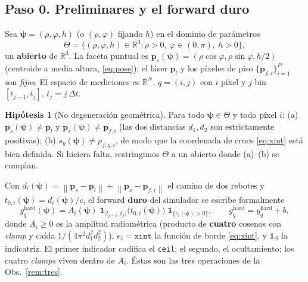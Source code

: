 \documentclass[11pt,a4paper]{article}
\theoremstyle{plain}
\theoremstyle{definition}
\newtheorem{assumption}{Hip\'otesis}
\newcommand{\vect}[1]{\boldsymbol{#1}}
\newcommand{\R}{\mathbb{R}}
\newcommand{\norm}[1]{\left\lVert #1 \right\rVert}
\begin{document}
\subsection*{Paso 0. Preliminares y el forward duro}
\label{sec:prelim}

Sea $\vect{\psi}=(\rho,\varphi,h)$ (o $(\rho,\varphi)$ fijando $h$) en el dominio
de par\'ametros
\begin{equation}
    \Theta=\bigl\{(\rho,\varphi,h)\in\R^3 : \rho>0,\ \varphi\in(0,\pi),\ h>0\bigr\},
    \label{eq:Theta}
\end{equation}
un \textbf{abierto} de $\R^3$. La faceta puntual es
$\vect{p}_s(\vect{\psi})=(\rho\cos\varphi,\rho\sin\varphi,h/2)$ (centroide a media
altura, \eqref{eq:pose}); el l\'aser $\vect{p}_l$ y los p\'ixeles de piso
$\{\vect{p}_{f,i}\}_{i=1}^{P}$ son \emph{fijos}. El espacio de mediciones es $\R^N$, $q=(i,j)$ con $i$ p\'ixel y $j$
bin $[t_{j-1},t_j]$, $t_j=j\,\Delta t$.

\begin{assumption}[No degeneraci\'on geom\'etrica]\label{as:geom}
Para todo $\vect{\psi}\in\Theta$ y todo p\'ixel $i$:
(a) $\vect{p}_s(\vect{\psi})\neq\vect{p}_l$ y
$\vect{p}_s(\vect{\psi})\neq\vect{p}_{f,i}$ (las dos distancias $d_1,d_2$ son
estrictamente positivas);
(b) $s_y(\vect{\psi})\neq p_{f,y,i}$, de modo que la coordenada de cruce
\eqref{eq:xint} est\'a bien definida. Si hiciera falta, restringimos $\Theta$ a
un abierto donde (a)--(b) se cumplan.
\end{assumption}

Con $d_i(\vect{\psi})=\norm{\vect{p}_s-\vect{p}_l}+\norm{\vect{p}_s-\vect{p}_{f,i}}$
el camino de dos rebotes y $t_{0,i}(\vect{\psi})=d_i(\vect{\psi})/c$, el forward
\textbf{duro} del simulador se escribe formalmente
\begin{equation}
    y^{\mathrm{hard}}_q(\vect{\psi})
    =A_i(\vect{\psi})\;
    \mathbf{1}_{[t_{j-1},t_j)}\!\bigl(t_{0,i}(\vect{\psi})\bigr)\;
    \mathbf{1}_{\{e_i(\vect{\psi})>0\}},
    \qquad g^{\mathrm{hard}}_q=y^{\mathrm{hard}}_q+b,
    \label{eq:hard}
\end{equation}
donde $A_i\ge0$ es la amplitud radiom\'etrica (producto de \textbf{cuatro}
cosenos con \emph{clamp} y ca\'ida $1/(4\pi^2 d_1^2 d_2^2)$), $e_i=\texttt{xint}$
la funci\'on de borde \eqref{eq:xint}, y $\mathbf 1_S$ la indicatriz. El primer
indicador codifica el \texttt{ceil}; el segundo, el ocultamiento; los cuatro
\emph{clamps} viven dentro de $A_i$. \'Estas son las tres operaciones de la
Obs.~\ref{rem:tres}.
\end{document}
